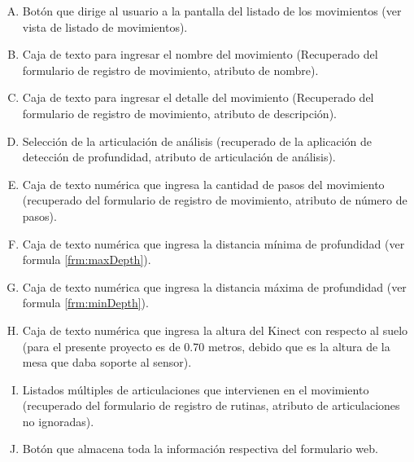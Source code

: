 \begin{enumerate}[A.]
\item Bot\'on que dirige al usuario a la pantalla del listado de los movimientos (ver vista de listado de movimientos).
\item Caja de texto para ingresar el nombre del movimiento (Recuperado del formulario de registro de movimiento, atributo de nombre).
\item Caja de texto para ingresar el detalle del movimiento (Recuperado del formulario de registro de movimiento, atributo de descripci\'on).
\item Selecci\'on de la articulaci\'on de an\'alisis (recuperado de la aplicaci\'on de detecci\'on de profundidad, atributo de articulaci\'on de an\'alisis).
\item Caja de texto num\'erica que ingresa la cantidad de pasos del movimiento (recuperado del formulario de registro de movimiento, atributo de n\'umero de pasos).
\item Caja de texto num\'erica que ingresa la distancia m\'inima de profundidad (ver formula \ref{frm:maxDepth}).
\item Caja de texto num\'erica que ingresa la distancia m\'axima de profundidad (ver formula \ref{frm:minDepth}).
\item Caja de texto num\'erica que ingresa la altura del Kinect con respecto al suelo (para el presente proyecto es de 0.70 metros, debido que es la altura de la mesa que daba soporte al sensor).
\item Listados m\'ultiples de articulaciones que intervienen en el movimiento (recuperado del formulario de registro de rutinas, atributo de articulaciones no ignoradas).
\item Bot\'on que almacena toda la informaci\'on respectiva del formulario web.
\end{enumerate}
